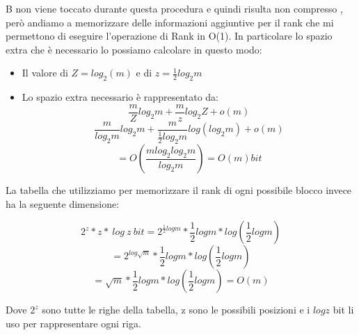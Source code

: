 \documentclass[14pt]{extreport}
\begin{document}
B non viene toccato durante questa procedura e quindi risulta non compresso , però andiamo a memorizzare delle informazioni aggiuntive per il rank che mi permettono di eseguire l'operazione di Rank in O(1).
In particolare lo spazio extra che è necessario lo possiamo calcolare in questo modo:

\begin{itemize}
    \item Il valore di $Z = log_2(m)$ e di $z = \frac{1}{2}log_2 m$
    \item Lo spazio extra necessario è rappresentato da:
    \begin{equation}
        \frac{m}{Z}log_2 m + \frac{m}{z} log_2 Z + o(m)
    \end{equation}
        \begin{equation}
        \frac{m}{log_2 m}log_2 m + \frac{m}{\frac{1}{2}log_2 m} log(log_2 m) + o(m)
    \end{equation}
    \begin{equation}
        = O(\frac{m log_2 log_2 m}{log_2 m}) = O(m) bit
    \end{equation}
\end{itemize}

La tabella che utilizziamo per memorizzare il rank di ogni possibile blocco invece ha la seguente dimensione:

    \begin{equation}
        2^z*z * \ log \ z \ bit = 2^{\frac{1}{2}logm}*\frac{1}{2}logm * log(\frac{1}{2} logm)
    \end{equation}
    \begin{equation}
        = 2^{log\sqrt{m}}*\frac{1}{2}logm * log(\frac{1}{2} logm)
    \end{equation}
    \begin{equation}
        = \sqrt{m} * \frac{1}{2}logm * log(\frac{1}{2}logm) = O(m)
    \end{equation}
    
Dove $2^z$ sono tutte le righe della tabella, z sono le possibili posizioni e i $logz$ bit li uso per rappresentare ogni riga.
    
\end{document}
